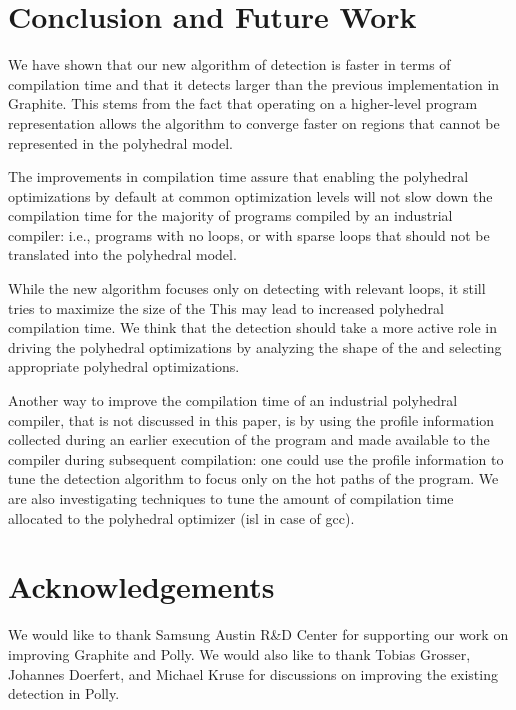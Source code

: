 \documentclass{sig-alternate}
\begin{document}
\section{Conclusion and Future Work}
We have shown that our new algorithm of \SCoP{} detection is faster in terms of
compilation time and that it detects larger  than the previous
implementation in Graphite.  This stems from the fact that operating on a
higher-level program representation allows the algorithm to converge faster on
regions that cannot be represented in the polyhedral model.

The improvements in compilation time assure that enabling the polyhedral
optimizations by default at common optimization levels will not slow down the
compilation time for the majority of programs compiled by an industrial
compiler: i.e., programs with no loops, or with sparse loops that should not be
translated into the polyhedral model.

While the new algorithm focuses only on detecting  with relevant loops,
it still tries to maximize the size of the   This may lead to increased
polyhedral compilation time.  We think that the \SCoP{} detection should take a
more active role in driving the polyhedral optimizations by analyzing the shape
of the  and selecting appropriate polyhedral optimizations.

Another way to improve the compilation time of an industrial polyhedral
compiler, that is not discussed in this paper, is by using the profile
information collected during an earlier execution of the program and made
available to the compiler during subsequent compilation: one could use the
profile information to tune the \SCoP{} detection algorithm to focus only on the
hot paths of the program.  We are also investigating techniques to tune the
amount of compilation time allocated to the polyhedral optimizer (isl
\cite{verdoolaege2010isl} in case of gcc).

\section{Acknowledgements}
We would like to thank Samsung Austin R\&D Center for supporting our work on
improving Graphite and Polly.  We would also like to thank Tobias Grosser,
Johannes Doerfert, and Michael Kruse for discussions on improving the existing
\SCoP{} detection in Polly.


{\small

}
\end{document}
